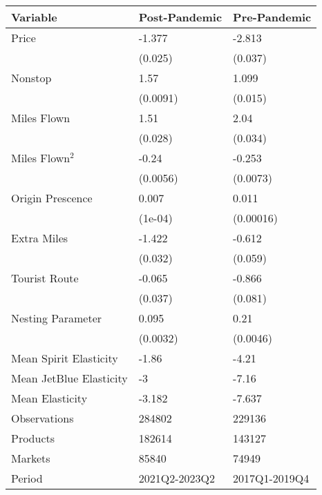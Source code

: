 
\begin{tabular}[t]{lll}
\toprule
Variable & Post-Pandemic & Pre-Pandemic\\
\midrule
Price & -1.377 & -2.813\\
 & (0.025) & (0.037)\\
Nonstop & 1.57 & 1.099\\
 & (0.0091) & (0.015)\\
Miles Flown & 1.51 & 2.04\\
\addlinespace
 & (0.028) & (0.034)\\
Miles Flown$^2$ & -0.24 & -0.253\\
 & (0.0056) & (0.0073)\\
Origin Prescence & 0.007 & 0.011\\
 & (1e-04) & (0.00016)\\
\addlinespace
Extra Miles & -1.422 & -0.612\\
 & (0.032) & (0.059)\\
Tourist Route & -0.065 & -0.866\\
 & (0.037) & (0.081)\\
Nesting Parameter & 0.095 & 0.21\\
\addlinespace
 & (0.0032) & (0.0046)\\
\midrule
Mean Spirit Elasticity & -1.86 & -4.21\\
Mean JetBlue Elasticity & -3 & -7.16\\
Mean Elasticity & -3.182 & -7.637\\
Observations & 284802 & 229136\\
\addlinespace
Products & 182614 & 143127\\
Markets & 85840 & 74949\\
Period & 2021Q2-2023Q2 & 2017Q1-2019Q4\\
\bottomrule
\end{tabular}
